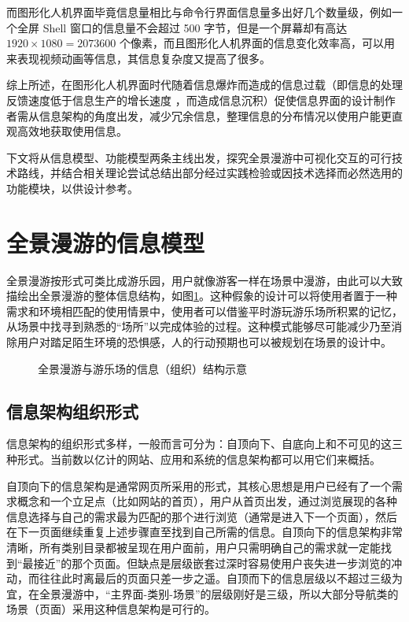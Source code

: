 而图形化人机界面毕竟信息量相比与命令行界面信息量多出好几个数量级，例如一个全屏 Shell 窗口的信息量不会超过 500 字节，但是一个屏幕却有高达 $1920\times1080=2073600$ 个像素，而且图形化人机界面的信息变化效率高，可以用来表现视频动画等信息，其信息复杂度又提高了很多。

综上所述，在图形化人机界面时代随着信息爆炸而造成的信息过载（即信息的处理反馈速度低于信息生产的增长速度
，而造成信息沉积）促使信息界面的设计制作者需从信息架构的角度出发，减少冗余信息，整理信息的分布情况以使用户能更直观高效地获取使用信息。

下文将从信息模型、功能模型两条主线出发，探究全景漫游中可视化交互的可行技术路线，并结合相关理论尝试总结出部分经过实践检验或因技术选择而必然选用的功能模块，以供设计参考。


\section{全景漫游的信息模型}

全景漫游按形式可类比成游乐园，用户就像游客一样在场景中漫游，由此可以大致描绘出全景漫游的整体信息结构，如图\ref{fig:park}。这种假象的设计可以将使用者置于一种需求和环境相匹配的使用情景中，使用者可以借鉴平时游玩游乐场所积累的记忆，从场景中找寻到熟悉的“场所”以完成体验的过程。这种模式能够尽可能减少乃至消除用户对踏足陌生环境的恐惧感，人的行动预期也可以被规划在场景的设计中。

\begin{figure}[htp]
\centering
{}
\caption{全景漫游与游乐场的信息（组织）结构示意}
\label{fig:park}
\end{figure}

\subsection{信息架构组织形式}
信息架构的组织形式多样，一般而言可分为：自顶向下、自底向上和不可见的这三种形式。当前数以亿计的网站、应用和系统的信息架构都可以用它们来概括。

自顶向下的信息架构是通常网页所采用的形式，其核心思想是用户已经有了一个需求概念和一个立足点（比如网站的首页），用户从首页出发，通过浏览展现的各种信息选择与自己的需求最为匹配的那个进行浏览（通常是进入下一个页面），然后在下一页面继续重复上述步骤直至找到自己所需的信息。自顶向下的信息架构非常清晰，所有类别目录都被呈现在用户面前，用户只需明确自己的需求就一定能找到“最接近”的那个页面。但缺点是层级嵌套过深时容易使用户丧失进一步浏览的冲动，而往往此时离最后的页面只差一步之遥。自顶而下的信息层级以不超过三级为宜，在全景漫游中，“主界面-类别-场景”的层级刚好是三级，所以大部分导航类的场景（页面）采用这种信息架构是可行的。

